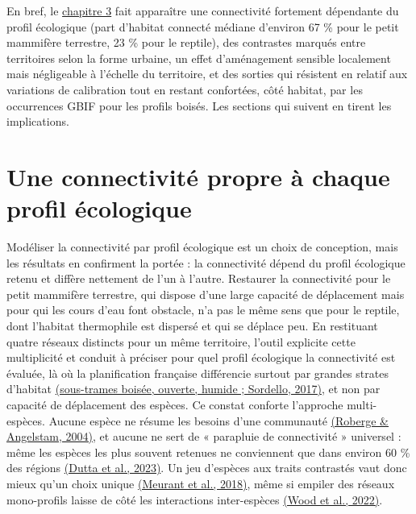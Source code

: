 \documentclass[a4paper,11pt]{report}
\begin{document}
En bref, le \hyperref[chap:3]{chapitre 3} fait apparaître une connectivité fortement dépendante du profil écologique (part d'habitat connecté médiane d'environ 67 \% pour le petit mammifère terrestre, 23 \% pour le reptile), des contrastes marqués entre territoires selon la forme urbaine, un effet d'aménagement sensible localement mais négligeable à l'échelle du territoire, et des sorties qui résistent en relatif aux variations de calibration tout en restant confortées, côté habitat, par les occurrences GBIF pour les profils boisés. Les sections qui suivent en tirent les implications.

\section{Une connectivité propre à chaque profil écologique}\label{sec:4.1}

Modéliser la connectivité par profil écologique est un choix de conception, mais les résultats en confirment la portée : la connectivité dépend du profil écologique retenu et diffère nettement de l'un à l'autre. Restaurer la connectivité pour le petit mammifère terrestre, qui dispose d'une large capacité de déplacement mais pour qui les cours d'eau font obstacle, n'a pas le même sens que pour le reptile, dont l'habitat thermophile est dispersé et qui se déplace peu. En restituant quatre réseaux distincts pour un même territoire, l'outil explicite cette multiplicité et conduit à préciser pour quel profil écologique la connectivité est évaluée, là où la planification française différencie surtout par grandes strates d'habitat \hyperref[sec:bibliographie]{(sous-trames boisée, ouverte, humide ; Sordello, 2017)}, et non par capacité de déplacement des espèces. Ce constat conforte l'approche multi-espèces. Aucune espèce ne résume les besoins d'une communauté \hyperref[sec:bibliographie]{(Roberge \& Angelstam, 2004)}, et aucune ne sert de « parapluie de connectivité » universel : même les espèces les plus souvent retenues ne conviennent que dans environ 60 \% des régions \hyperref[sec:bibliographie]{(Dutta et al., 2023)}. Un jeu d'espèces aux traits contrastés vaut donc mieux qu'un choix unique \hyperref[sec:bibliographie]{(Meurant et al., 2018)}, même si empiler des réseaux mono-profils laisse de côté les interactions inter-espèces \hyperref[sec:bibliographie]{(Wood et al., 2022)}.
\end{document}
